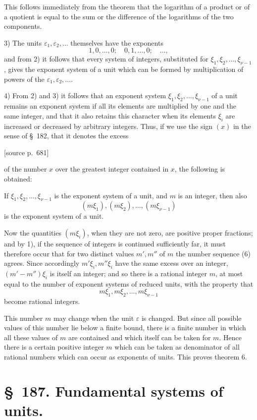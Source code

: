 \documentclass[11pt]{article}
\newcommand{\srcpage}[1]{\par\medskip\noindent\textsf{[source p.~#1]}\par\smallskip}
\begin{document}
This follows immediately from the theorem that the logarithm of a product or of a quotient is equal to the sum or the difference of the logarithms of the two components.

3) The units $\varepsilon_1,\varepsilon_2,\ldots$ themselves have the exponents
\[
1,0,\ldots,0;\quad 0,1,\ldots,0;\quad\ldots,
\]
and from 2) it follows that every system of integers, substituted for $\xi_1,\xi_2,\ldots,\xi_{\nu-1}$, gives the exponent system of a unit which can be formed by multiplication of powers of the $\varepsilon_1,\varepsilon_2,\ldots$.

4) From 2) and 3) it follows that an exponent system $\xi_1,\xi_2,\ldots,\xi_{\nu-1}$ of a unit remains an exponent system if all its elements are multiplied by one and the same integer, and that it also retains this character when its elements $\xi_i$ are increased or decreased by arbitrary integers. Thus, if we use the sign $(x)$ in the sense of \S~182, that it denotes the excess
\srcpage{681}
of the number $x$ over the greatest integer contained in $x$, the following is obtained:

If $\xi_1,\xi_2,\ldots,\xi_{\nu-1}$ is the exponent system of a unit, and $m$ is an integer, then also
\begin{equation}
(m\xi_1),(m\xi_2),\ldots,(m\xi_{\nu-1})
\tag{6}
\end{equation}
is the exponent system of a unit.

Now the quantities $(m\xi_i)$, when they are not zero, are positive proper fractions; and by 1), if the sequence of integers is continued sufficiently far, it must therefore occur that for two distinct values $m',m''$ of $m$ the number sequence (6) agrees. Since accordingly $m'\xi_i,m''\xi_i$ have the same excess over an integer, $(m'-m'')\xi_i$ is itself an integer; and so there is a rational integer $m$, at most equal to the number of exponent systems of reduced units, with the property that
\[
m\xi_1,m\xi_2,\ldots,m\xi_{\nu-1}
\]
become rational integers.

This number $m$ may change when the unit $\varepsilon$ is changed. But since all possible values of this number lie below a finite bound, there is a finite number in which all these values of $m$ are contained and which itself can be taken for $m$. Hence there is a certain positive integer $m$ which can be taken as denominator of all rational numbers which can occur as exponents of units. This proves theorem 6.

\section*{\S~187. Fundamental systems of units.}
\end{document}
